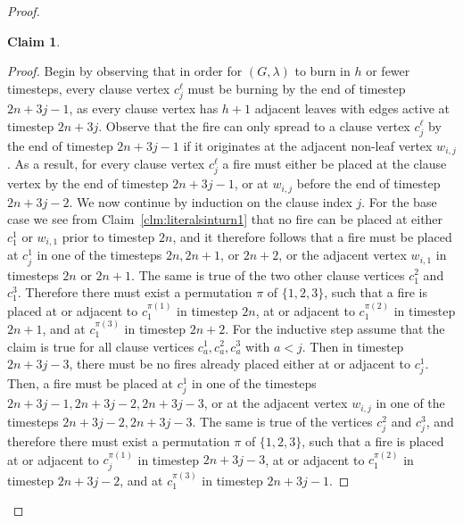 \documentclass[preprint,12pt]{elsarticle}
\newtheorem{claim}{Claim}
\begin{document}
\begin{proof}
\begin{claim}
    \end{claim}
    \begin{proof}
    	Begin by observing that in order for $(G, \lambda)$ to burn in $h$ or fewer timesteps, every clause vertex $c_j^\ell$ must be burning by the end of timestep $2n+3j-1$, as every clause vertex has $h+1$ adjacent leaves with edges active at timestep $2n+3j$. Observe that the fire can only spread to a clause vertex $c_j^\ell$ by the end of timestep $2n+3j-1$ if it originates at the adjacent non-leaf vertex $w_{i,j}$. As a result, for every clause vertex $c_j^\ell$ a fire must either be placed at the clause vertex by the end of timestep $2n+3j-1$, or at $w_{i,j}$ before the end of timestep $2n+3j-2$. We now continue by induction on the clause index $j$. For the base case we see from Claim~\ref{clm:literalsinturn1} that no fire can be placed at either $c_1^1$ or $w_{i,1}$ prior to timestep $2n$, and it therefore follows that a fire must be placed at $c_j^1$ in one of the timesteps $2n, 2n+1$, or $2n+2$, or the adjacent vertex $w_{i,1}$ in timesteps $2n$ or $2n+1$. The same is true of the two other clause vertices $c_1^2$ and $c_1^3$. Therefore there must exist a permutation $\pi$ of $\{1, 2, 3\}$, such that a fire is placed at or adjacent to $c_1^{\pi(1)}$ in timestep $2n$, at or adjacent to $c_1^{\pi(2)}$ in timestep $2n+1$, and at $c_1^{\pi(3)}$ in timestep $2n+2$. For the inductive step assume that the claim is true for all clause vertices $c_a^1, c_a^2, c_a^3$ with $a < j$. Then in timestep $2n+3j-3$, there must be no fires already placed either at or adjacent to $c_j^1$. Then, a fire must be placed at $c_j^1$ in one of the timesteps $2n+3j-1, 2n+3j-2, 2n+3j-3$, or at the adjacent vertex $w_{i,j}$ in one of the timesteps $2n+3j-2, 2n+3j-3$. The same is true of the vertices $c_j^2$ and $c_j^3$, and therefore there must exist a permutation $\pi$ of $\{1, 2, 3\}$, such that a fire is placed at or adjacent to $c_j^{\pi(1)}$ in timestep $2n+3j-3$, at or adjacent to $c_1^{\pi(2)}$ in timestep $2n+3j-2$, and at $c_1^{\pi(3)}$ in timestep $2n+3j-1$.
    \end{proof}


\end{proof}
\end{document}
